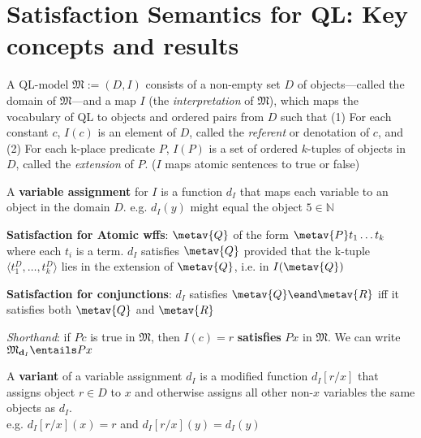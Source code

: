 ﻿%
\pagestyle{appendixstyle}
\setlength{\topmargin}{0 in}
\setlength{\headheight}{0 in}
\setlength{\headsep}{0 in}
\setlength{\textheight}{9 in}
\setlength{\evensidemargin}{0.25 in}
\setlength{\oddsidemargin}{0.25 in}
\setlength{\textwidth}{6 in}



\section*{\hfill \normalsize \bf Satisfaction Semantics for QL: Key concepts and results \hfill} 

A QL-model $\mathfrak{M} := (D, I)$ consists of a non-empty set $D$ of objects---called the domain of $\mathfrak{M}$---and a map $I$ (the \textit{interpretation} of $\mathfrak{M}$), which maps the vocabulary of QL to objects and ordered pairs from $D$ such that (1) For each constant $c$, $I(c)$ is an element of $D$, called the \textit{referent} or denotation of $c$, and (2) For each k-place predicate $P$, $I(P)$ is a set of ordered $k$-tuples of objects in $D$, called the \textit{extension} of $P$. ($I$ maps atomic sentences to true or false)

A \textbf{variable assignment} for $I$ is a function $d_I$ that maps each variable to an object in the domain $D$. e.g. $d_I (y)$ might equal the object $5 \in \mathbb{N}$ 



\textbf{Satisfaction for Atomic wffs}: $\metav{Q}$ of the form $\metav{P}t_1\dots t_k$ where each $t_i$ is a term. $d_I$ satisfies $\metav{Q}$ provided that the k-tuple $\langle t_1^D, \dots , t_k^D \rangle$ lies in the extension of $\metav{Q}$, i.e. in $I(\metav{Q})$

\textbf{Satisfaction for conjunctions}: $d_I$ satisfies $\metav{Q} \eand \metav{R}$ iff it satisfies both $\metav{Q}$ and $\metav{R}$

\textit{Shorthand}: if $Pc$ is true in $\mathfrak{M}$, then $I(c)=r$ \textbf{satisfies} $Px$ in $\mathfrak{M}$. We can write $\mathfrak{M}_{\mathbf{d}_I} \entails Px$

A \textbf{variant} of a variable assignment  $d_I$ is a modified function $d_I[r/x]$ that assigns object $r \in D$ to $x$ and otherwise assigns all other non-$x$ variables the same objects as $d_I$. \\ e.g. $d_I[r/x](x) = r$ and $d_I[r/x] (y) = d_I (y) $

